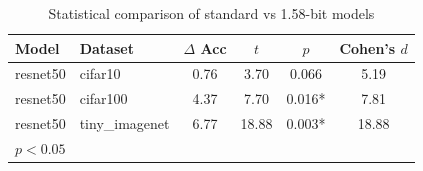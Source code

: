 \begin{table}[h]
\centering
\caption{Statistical comparison of standard vs 1.58-bit models}
\label{tab:statistics}
\begin{tabular}{llcccc}
\toprule
Model & Dataset & $\Delta$ Acc & $t$ & $p$ & Cohen's $d$ \\
\midrule
resnet50 & cifar10 & 0.76 & 3.70 & 0.066 & 5.19 \\
resnet50 & cifar100 & 4.37 & 7.70 & 0.016* & 7.81 \\
resnet50 & tiny_imagenet & 6.77 & 18.88 & 0.003* & 18.88 \\
\bottomrule
\multicolumn{6}{l}{\footnotesize * $p < 0.05$} \\
\end{tabular}
\end{table}